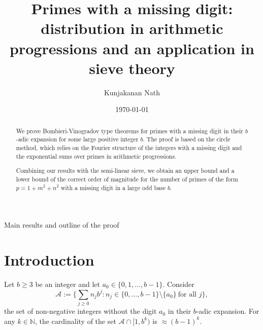 \documentclass[12pt]{amsart}
\makeatletter
\renewcommand\part{\@startsection{part}{2}%
	\z@{0.5\linespacing\@plus2\linespacing}{\linespacing}%
	{\normalfont\large\scshape\bfseries\centering}}
\numberwithin{equation}{section}
\theoremstyle{remark}
\theoremstyle{definition}
\makeatother
\begin{document}
\title[Primes with a missing digit in arithmetic progressions]{Primes with a missing digit: distribution in arithmetic progressions and an application in sieve theory}

\author[Kunjakanan Nath]{Kunjakanan Nath}

\address{Department of Mathematics,
University of Illinois Urbana-Champaign,
Altgeld Hall, 1409 W. Green Street,
Urbana, IL, 61801, USA}

\date{\today}







\begin{abstract}
We prove Bombieri-Vinogradov type theorems for primes with a missing digit in their $b$-adic expansion for some large positive integer $b$. The proof is based on the circle method, which relies on the Fourier structure of the integers with a missing digit and the exponential sums over primes in arithmetic progressions. 

Combining our results with the semi-linear sieve, we obtain an upper bound and a lower bound of the correct order of magnitude for the number of primes of the form $p=1+m^2+n^2$ with a missing digit in a large odd base $b$.
\end{abstract}


\maketitle


\setcounter{tocdepth}{1}

\tableofcontents

\part{Main results and outline of the proof}



\section{Introduction}\label{sec: Intro}
Let $b\geq 3$ be an integer and let $a_0\in\{0, 1, \dotsc, b-1\}$. Consider 
\[\mathcal{A}:=\bigg\{\sum_{j\geq 0}n_jb^j: n_j\in \{0, \dotsc, b-1\}\setminus \{a_0\}\: \text{for all $j$}\bigg\},\]
the set of non-negative integers without the digit $a_0$ in their $b$-adic expansion. For any $k\in \mathbb{N}$, the cardinality of the set $\mathcal{A}\cap [1, b^k)$ is $\approx (b-1)^k$. 
\end{document}
